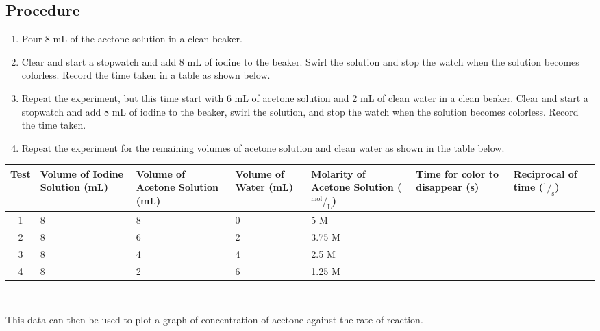 \subsection{Procedure}
\begin{enumerate}
\item Pour 8 mL of the acetone solution in a clean beaker. 
\item Clear and start a stopwatch and add 8 mL of iodine to the beaker. Swirl the solution and stop the watch when the solution becomes colorless. Record the time taken in a table as shown below.
\item  Repeat the experiment, but this time start with 6 mL of acetone solution and 2 mL of clean water in a clean beaker. Clear and start a stopwatch and add 8 mL of iodine to the beaker, swirl the solution, and stop the watch when the solution becomes colorless. Record the time taken.
\item Repeat the experiment for the remaining volumes of acetone solution and clean water as shown in the table below.
\end{enumerate}

\begin{center}
\begin{tabular}{|c|p{2cm}|p{2cm}|p{2cm}|p{2cm}|p{2cm}|p{1.5cm}|} \hline
Test&Volume of Iodine Solution (mL)&Volume of Acetone Solution (mL)&Volume of Water (mL)&Molarity of Acetone Solution ($^{\text{mol}}/_\text{L}$)&Time for color to disappear (s)&Reciprocal of time ($^1/_\text{s}$) \\ \hline
1&8&8&0&5 M&& \\ \hline
2&8&6&2&3.75 M&& \\ \hline
3&8&4&4&2.5 M&& \\ \hline
4&8&2&6&1.25 M&& \\ \hline
\end{tabular} \\[10pt]
\end{center}

This data can then be used to plot a graph of concentration of acetone against the rate of reaction.

